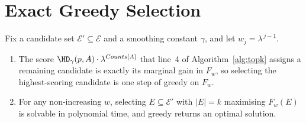 \section{Exact Greedy Selection}
\label{app:greedy}

\begin{proposition}
\label{prop:greedy-exact}
Fix a candidate set $\mathcal{E}'\subseteq\mathcal{E}$ and a smoothing constant $\gamma$, and let $w_j=\lambda^{\,j-1}$.
\begin{enumerate}[label=(\roman*),leftmargin=*]
\item The score $\HD_\gamma(p,A)\cdot\lambda^{Counts[A]}$ that line~4 of Algorithm~\ref{alg:topk} assigns a remaining candidate is exactly its marginal gain in $F_w$, so selecting the highest-scoring candidate is one step of greedy on $F_w$.
\item For any non-increasing $w$, selecting $E\subseteq\mathcal{E}'$ with $|E|=k$ maximising $F_w(E)$ is solvable in polynomial time, and greedy returns an optimal solution.
\end{enumerate}
\end{proposition}

